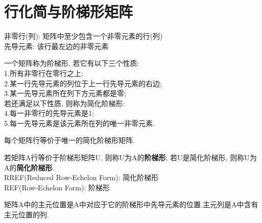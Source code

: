 \begin{center}
\end{center}
\newpage

\section{行化简与阶梯形矩阵}
非零行(列): 矩阵中至少包含一个非零元素的行(列)\\
先导元素: 该行最左边的非零元素\\
\begin{definition}
一个矩阵称为阶梯形, 若它有以下三个性质:\\
1.所有非零行在零行之上;\\
2.某一行先导元素的列位于上一行先导元素的右边;\\
3.某一先导元素所在列下方元素都是零;\\
若还满足以下性质, 则称为简化阶梯形:\\
4.每一非零行的先导元素是1;\\
5.每一先导元素是该元素所在列的唯一非零元素.
\end{definition}\vspace{2ex}

\begin{TheoremTwo}[简化阶梯形矩阵的唯一性]
每个矩阵行等价于唯一的简化阶梯形矩阵.
\end{TheoremTwo}\vspace{2ex}

若矩阵A行等价于阶梯形矩阵U, 则称U为A的\textbf{阶梯形}; 若U是简化阶梯形, 则称U为A的\textbf{简化阶梯形}. \\
RREF(Reduced Row-Echelon Form): 简化阶梯形\\
REF(Row-Echelon Form): 阶梯形\\[2ex]

\begin{definition}
矩阵A中的{\heiti 主元位置}是A中对应于它的阶梯形中先导元素的位置.{\heiti 主元列}是A中含有主元位置的列.
\end{definition}\vspace{2ex}

